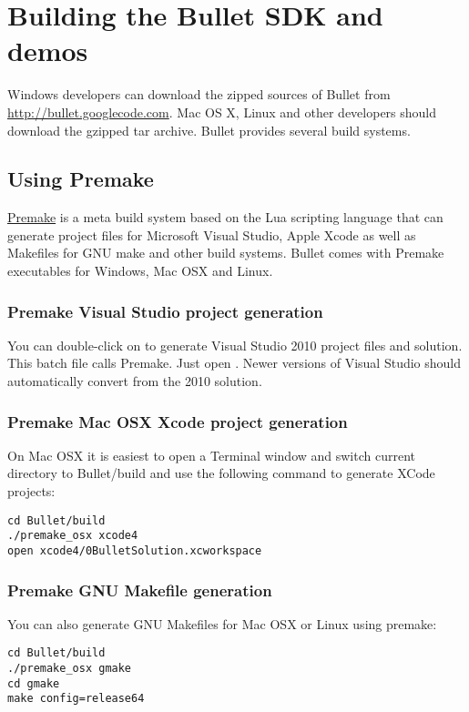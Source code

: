 \chapter{Building the Bullet SDK and demos}
Windows developers can download the zipped sources of Bullet from \url{http://bullet.googlecode.com}. Mac OS X, Linux and other developers should download the gzipped tar archive.
Bullet provides several build systems.

\section{Using Premake}
\href{http://industriousone.com/premake}{Premake} is a meta build system based on the Lua scripting language that can generate project files for Microsoft Visual Studio, Apple Xcode as well as Makefiles for GNU make and other build systems. Bullet comes with Premake executables for Windows, Mac OSX and Linux.
\subsection{Premake Visual Studio project generation}
You can double-click on  to generate Visual Studio 2010 project files and solution. This batch file calls Premake. Just open . Newer versions of Visual Studio should automatically convert from the 2010 solution.
\subsection{Premake Mac OSX Xcode project generation}
On Mac OSX it is easiest to open a Terminal window and switch current directory to Bullet/build and use the following command to generate XCode projects:
 \begin{lstlisting}[caption=Premake for Mac OSX, label=premake_osx]
cd Bullet/build
./premake_osx xcode4
open xcode4/0BulletSolution.xcworkspace
\end{lstlisting}

\subsection{Premake GNU Makefile generation}
You can also generate GNU Makefiles for Mac OSX or Linux using premake:
\begin{lstlisting}[caption=Premake to GNU Makefile, label=premake_make]
cd Bullet/build
./premake_osx gmake
cd gmake
make config=release64
\end{lstlisting}
